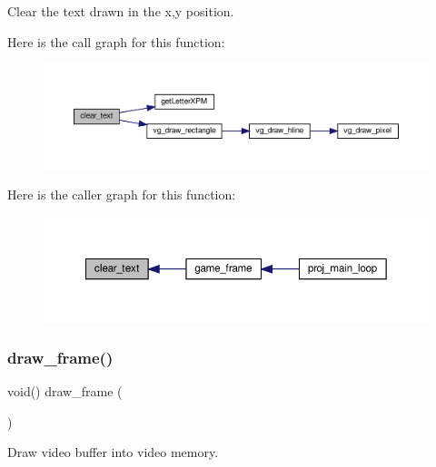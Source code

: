 Clear the text drawn in the x,y position. 

Here is the call graph for this function\+:\nopagebreak
\begin{figure}[H]
\begin{center}
\leavevmode
\includegraphics[width=350pt]{group__graphics_ga51ea06097c3bf68f7963901b0296bde6_cgraph}
\end{center}
\end{figure}
Here is the caller graph for this function\+:\nopagebreak
\begin{figure}[H]
\begin{center}
\leavevmode
\includegraphics[width=350pt]{group__graphics_ga51ea06097c3bf68f7963901b0296bde6_icgraph}
\end{center}
\end{figure}
\mbox{\label{group__graphics_gae70314d2e6e41dae20ce327a13929401}} 
\subsubsection{\texorpdfstring{draw\+\_\+frame()}{draw\_frame()}}
{\footnotesize\ttfamily void() draw\+\_\+frame (\begin{DoxyParamCaption}{ }\end{DoxyParamCaption})}



Draw video buffer into video memory. 

